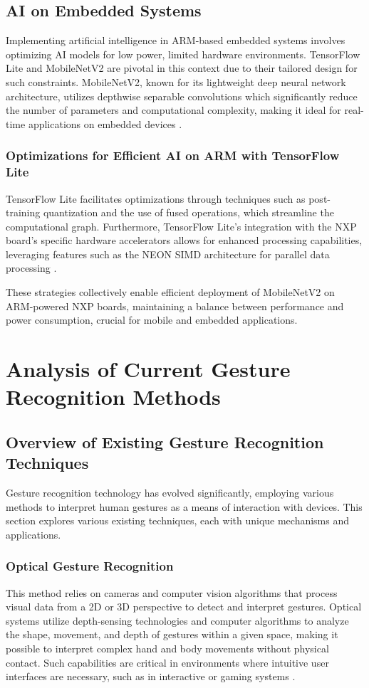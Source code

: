 \section{AI on Embedded Systems}
\label{sec:ai_embedded_systems}
Implementing artificial intelligence in ARM-based embedded systems involves optimizing AI models for low power, limited hardware environments. TensorFlow Lite and MobileNetV2 are pivotal in this context due to their tailored design for such constraints. MobileNetV2, known for its lightweight deep neural network architecture, utilizes depthwise separable convolutions which significantly reduce the number of parameters and computational complexity, making it ideal for real-time applications on embedded devices \cite{mobilnetv2}.

\subsection{Optimizations for Efficient AI on ARM with TensorFlow Lite}
TensorFlow Lite facilitates optimizations through techniques such as post-training quantization and the use of fused operations, which streamline the computational graph. Furthermore, TensorFlow Lite's integration with the NXP board's specific hardware accelerators allows for enhanced processing capabilities, leveraging features such as the NEON SIMD architecture for parallel data processing \cite{tensorflow2015-whitepaper}.

These strategies collectively enable efficient deployment of MobileNetV2 on ARM-powered NXP boards, maintaining a balance between performance and power consumption, crucial for mobile and embedded applications.

\chapter{Analysis of Current Gesture Recognition Methods}
\section{Overview of Existing Gesture Recognition Techniques}

Gesture recognition technology has evolved significantly, employing various methods to interpret human gestures as a means of interaction with devices. This section explores various existing techniques, each with unique mechanisms and applications.

\subsection{Optical Gesture Recognition}
This method relies on cameras and computer vision algorithms that process visual data from a 2D or 3D perspective to detect and interpret gestures. Optical systems utilize depth-sensing technologies and computer algorithms to analyze the shape, movement, and depth of gestures within a given space, making it possible to interpret complex hand and body movements without physical contact. Such capabilities are critical in environments where intuitive user interfaces are necessary, such as in interactive or gaming systems \cite{segen1998fast}.

